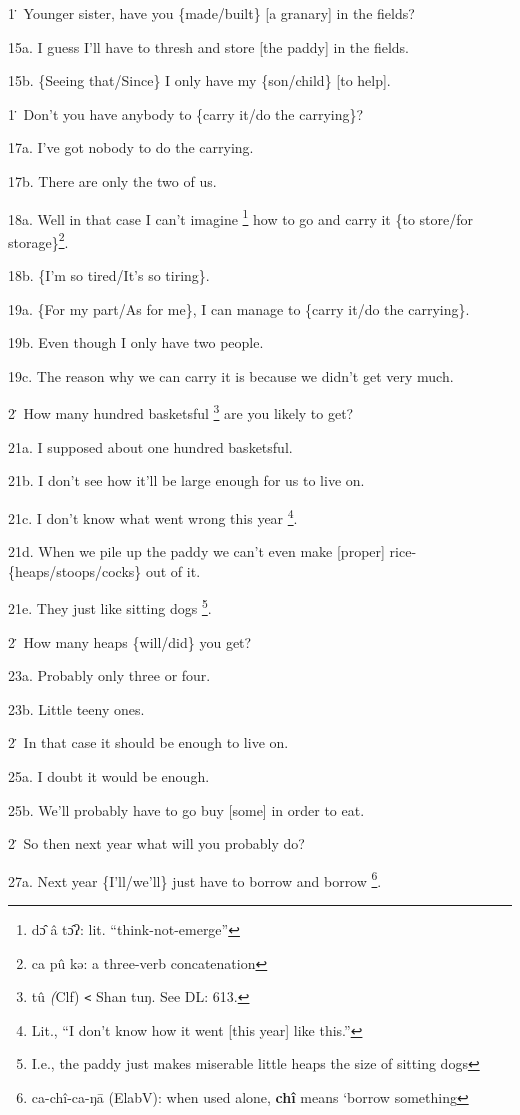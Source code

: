 1\. Younger sister, have you \{made/built\} [a granary] in the fields?

15a. I guess I'll have to thresh and store [the paddy] in the fields.

15b. \{Seeing that/Since\} I only have my \{son/child\} [to help].

1\. Don't you have anybody to \{carry it/do the carrying\}?

17a. I've got nobody to do the carrying.

17b. There are only the two of us.

18a. Well in that case I can't imagine \footnote{dɔ̂ â tɔ̂ʔ: lit. ``think-not-emerge''} how to go and carry it \{to store/for
storage\}\footnote{ca  pû  kə: a three-verb concatenation}.

18b. \{I'm so tired/It's so tiring\}.

19a. \{For my part/As for me\}, I can manage to \{carry it/do the carrying\}.

19b. Even though I only have two people.

19c. The reason why we can carry it is because we didn't get very much.

2\. How many hundred basketsful \footnote{tû \emph{(}Clf) \texttt{<} Shan tuŋ. See DL: 613.} are you likely to get?

21a. I supposed about one hundred basketsful.

21b. I don't see how it'll be large enough for us to live on.

21c. I don't know what went wrong this year \footnote{Lit., ``I don't know how it went [this year] like this.''}.

21d. When we pile up the paddy we can't even make [proper] rice-\{heaps/stoops/cocks\}
out of it.

21e. They just like sitting dogs \footnote{I.e., the paddy just makes miserable little heaps the size of sitting dogs}.

2\. How many heaps \{will/did\} you get?

23a. Probably only three or four.

23b. Little teeny ones.

2\. In that case it should be enough to live on.

25a. I doubt it would be enough.

25b. We'll probably have to go buy [some] in order to eat.

2\. So then next year what will you probably do?

27a. Next year \{I'll/we'll\} just have to borrow and borrow \footnote{ca-chî-ca-ŋā (ElabV): when used alone, \textbf{chî} means `borrow something}.

